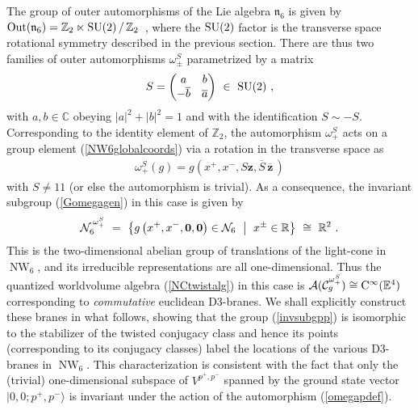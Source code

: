 \documentclass[11pt,a4paper]{article}
\DeclareMathOperator{\NW}{NW}
\newcommand{\mbf}[1]{{\boldsymbol {#1} }}
\def\mz{{\mbf z}}
\newcommand{\complex}{{\mathbb C}} %
\newcommand{\zed}{{\mathbb Z}} %
\newcommand{\real}{{\mathbb R}} %
\newcommand{\eucl}{{\mathbb E}}
\newcommand{\id}{{1\!\!1}} %
\newcommand{\beq}{\begin{eqnarray}}
\newcommand{\eeq}{\end{eqnarray}}
\begin{document}
The group of outer automorphisms of the Lie algebra $\mathfrak{n}_6$ is given
by ${\rm Out}(\mathfrak{n}_6)=\zed_2\ltimes{\rm
  SU}(2)\,/\,\zed_2$~\cite{SF1}, where the ${\rm SU}(2)$ factor is the
transverse space rotational symmetry described in the previous
section. There are thus two families of outer automorphisms
$\omega_\pm^S$ parametrized by a matrix
\beq
S=\begin{pmatrix}a&b\\-\overline{b}&\overline{a}\end{pmatrix}~\in~
{\rm SU}(2) \ ,
\label{SU2matrixouter}\eeq
with $a,b\in\complex$ obeying $|a|^2+|b|^2=1$ and with the identification
$S\sim-S$. Corresponding to the identity element of $\zed_2$, the automorphism
$\omega_+^S$ acts on a group element (\ref{NW6globalcoords}) via a rotation in
the transverse space as
\beq
\omega_+^S(g)=g\left(x^+,x^-,S\mz,\overline{S}\,\overline{\mz}\,\right)
\label{omegapdef}\eeq
with $S\neq\id$ (or else the automorphism is trivial). As a consequence, the
invariant subgroup (\ref{Gomegagen}) in this case is given by
\beq
\mathcal{N}_6^{\,\omega_+^S}~=~\bigl\{g\left(x^+,x^-,\mbf0,\mbf0\right)
\in\mathcal{N}_6~\bigm|~x^\pm\in\real\bigr\}~\cong~\real^2 \ .
\label{invsubgpp}\eeq
This is the two-dimensional abelian group of translations of the light-cone in
$\NW_6$, and its irreducible representations are all one-dimensional. Thus the
quantized worldvolume algebra (\ref{NCtwistalg}) in this case is
$\mathcal{A}(\mathcal{C}_g^{\omega_+^S})\cong{\rm C}^\infty(\eucl^4)$
corresponding to {\it commutative} euclidean D3-branes. We shall explicitly
construct these branes in what follows, showing that the group
(\ref{invsubgpp}) is isomorphic to the stabilizer of the twisted
conjugacy class and hence its points (corresponding to its conjugacy
classes) label the locations of the various D3-branes in $\NW_6$. This
characterization is consistent with the fact that only the (trivial)
one-dimensional subspace of $V^{p^+,p^-}$ spanned by the ground state
vector $|0,0;p^+,p^-\rangle$ is invariant under the action of the
automorphism (\ref{omegapdef}).
\end{document}
